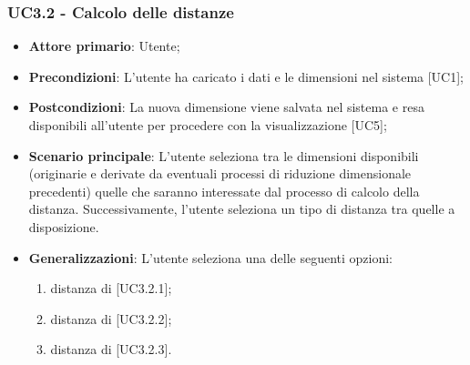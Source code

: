 \subsubsection{UC3.2 - Calcolo delle distanze}
\begin{itemize}
	\item \textbf{Attore primario}: Utente;
	\item \textbf{Precondizioni}: L'utente ha caricato i dati e le dimensioni nel sistema [UC1];
	\item \textbf{Postcondizioni}: La nuova dimensione viene salvata nel sistema e resa disponibili all'utente per procedere con la visualizzazione [UC5];

	\item \textbf{Scenario principale}: L'utente seleziona tra le dimensioni disponibili (originarie e derivate da eventuali processi di riduzione dimensionale precedenti) quelle che saranno interessate dal processo di calcolo della distanza. Successivamente, l'utente seleziona un tipo di distanza tra quelle a disposizione.
	
	\item \textbf{Generalizzazioni}: L'utente seleziona una delle seguenti opzioni:
	
	\begin{enumerate}
		\item distanza di  [UC3.2.1];
		\item distanza di  [UC3.2.2];
		\item distanza di  [UC3.2.3].
	\end{enumerate}
\end{itemize}